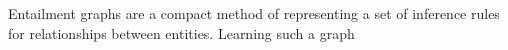



Entailment graphs are a compact method of representing 
a set of inference rules for relationships between
entities. Learning such a graph 


% 
